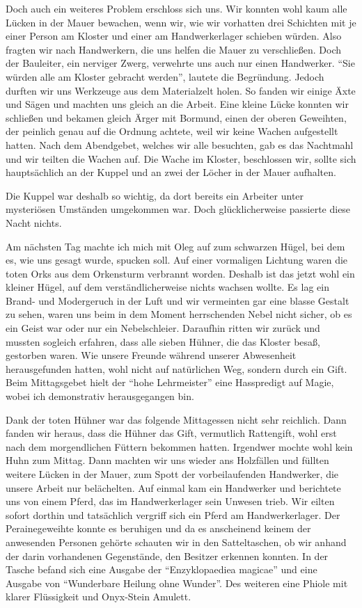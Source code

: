 Doch auch ein weiteres Problem erschloss sich uns. Wir konnten wohl kaum alle Lücken in der Mauer bewachen, wenn wir, wie wir vorhatten drei Schichten mit je einer Person am Kloster und einer am Handwerkerlager schieben würden. Also fragten wir nach Handwerkern, die uns helfen die Mauer zu verschließen. Doch der Bauleiter, ein nerviger Zwerg, verwehrte uns auch nur einen Handwerker. ``Sie würden alle am Kloster gebracht werden'', lautete die Begründung. Jedoch durften wir uns Werkzeuge aus dem Materialzelt holen. So fanden wir einige Äxte und Sägen und machten uns gleich an die Arbeit. Eine kleine Lücke konnten wir schließen und bekamen gleich Ärger mit Bormund, einen der oberen Geweihten, der peinlich genau auf die Ordnung achtete, weil wir keine Wachen aufgestellt hatten. Nach dem Abendgebet, welches wir alle besuchten, gab es das Nachtmahl und wir teilten die Wachen auf. Die Wache im Kloster, beschlossen wir, sollte sich hauptsächlich an der Kuppel und an zwei der Löcher in der Mauer aufhalten.

Die Kuppel war deshalb so wichtig, da dort bereits ein Arbeiter unter mysteriösen Umständen umgekommen war. Doch glücklicherweise passierte diese Nacht nichts.

Am nächsten Tag machte ich mich mit Oleg auf zum schwarzen Hügel, bei dem es, wie uns gesagt wurde, spucken soll. Auf einer vormaligen Lichtung waren die toten Orks aus dem Orkensturm verbrannt worden. Deshalb ist das jetzt wohl ein kleiner Hügel, auf dem verständlicherweise nichts wachsen wollte. Es lag ein Brand- und Modergeruch in der Luft und wir vermeinten gar eine blasse Gestalt zu sehen, waren uns beim in dem Moment herrschenden Nebel nicht sicher, ob es ein Geist war oder nur ein Nebelschleier. Daraufhin ritten wir zurück und mussten sogleich erfahren, dass alle sieben Hühner, die das Kloster besaß, gestorben waren. Wie unsere Freunde während unserer Abwesenheit herausgefunden hatten, wohl nicht auf natürlichen Weg, sondern durch ein Gift. Beim Mittagsgebet hielt der ``hohe Lehrmeister'' eine Hasspredigt auf Magie, wobei ich demonstrativ herausgegangen bin.


Dank der toten Hühner war das folgende Mittagessen nicht sehr reichlich. Dann fanden wir heraus, dass die Hühner das Gift, vermutlich Rattengift, wohl erst nach dem morgendlichen Füttern bekommen hatten. Irgendwer mochte wohl kein Huhn zum Mittag. Dann machten wir uns wieder ans Holzfällen und füllten weitere Lücken in der Mauer, zum Spott der vorbeilaufenden Handwerker, die unsere Arbeit nur belächelten. Auf einmal kam ein Handwerker und berichtete uns von einem Pferd, das im Handwerkerlager sein Unwesen trieb. Wir eilten sofort dorthin und tatsächlich vergriff sich ein Pferd am Handwerkerlager. Der Perainegeweihte konnte es beruhigen und da es anscheinend keinem der anwesenden Personen gehörte schauten wir in den Satteltaschen, ob wir anhand der darin vorhandenen Gegenstände, den Besitzer erkennen konnten. In der Tasche befand sich eine Ausgabe der ``Enzyklopaediea magicae'' und eine Ausgabe von ``Wunderbare Heilung ohne Wunder''. Des weiteren eine Phiole mit klarer Flüssigkeit und Onyx-Stein Amulett. 


